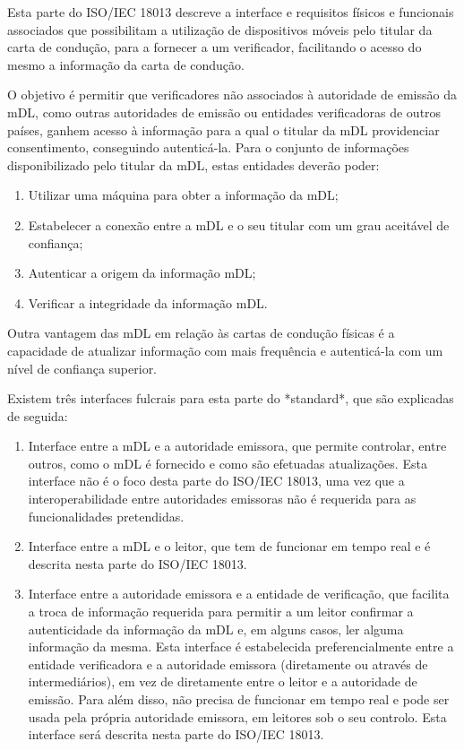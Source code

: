\documentclass[11pt]{article}
\begin{document}
Esta parte do ISO/IEC 18013 descreve a interface e requisitos físicos e funcionais associados que possibilitam a utilização de dispositivos móveis pelo titular da carta de condução, para a fornecer a um verificador, facilitando o acesso do mesmo a informação da carta de condução.

O objetivo é permitir que verificadores não associados à autoridade de emissão da mDL, como outras autoridades de emissão ou entidades verificadoras de outros países, ganhem acesso à informação para a qual o titular da mDL providenciar consentimento, conseguindo autenticá-la. Para o conjunto de informações disponibilizado pelo titular da mDL, estas entidades deverão poder:

\begin{enumerate}
	\item Utilizar uma máquina para obter a informação da mDL;
	\item Estabelecer a conexão entre a mDL e o seu titular com um grau aceitável de confiança;
	\item Autenticar a origem da informação mDL;
	\item Verificar a integridade da informação mDL.
\end{enumerate}

Outra vantagem das mDL em relação às cartas de condução físicas é a capacidade de atualizar informação com mais frequência e autenticá-la com um nível de confiança superior.

Existem três interfaces fulcrais para esta parte do *standard*, que são explicadas de seguida:

\begin{enumerate}
	\item Interface entre a mDL e a autoridade emissora, que permite controlar, entre outros, como o mDL é fornecido e como são efetuadas atualizações. Esta interface não é o foco desta parte do ISO/IEC 18013, uma vez que a interoperabilidade entre autoridades emissoras não é requerida para as funcionalidades pretendidas.
	\item Interface entre a mDL e o leitor, que tem de funcionar em tempo real e é descrita nesta parte do ISO/IEC 18013.
	\item Interface entre a autoridade emissora e a entidade de verificação, que facilita a troca de informação requerida para permitir a um leitor confirmar a autenticidade da informação da mDL e, em alguns casos, ler alguma informação da mesma. Esta interface é estabelecida preferencialmente entre a entidade verificadora e a autoridade emissora (diretamente ou através de intermediários), em vez de diretamente entre o leitor e a autoridade de emissão. Para além disso, não precisa de funcionar em tempo real e pode ser usada pela própria autoridade emissora, em leitores sob o seu controlo. Esta interface será descrita nesta parte do ISO/IEC 18013.
\end{enumerate}
\end{document}
